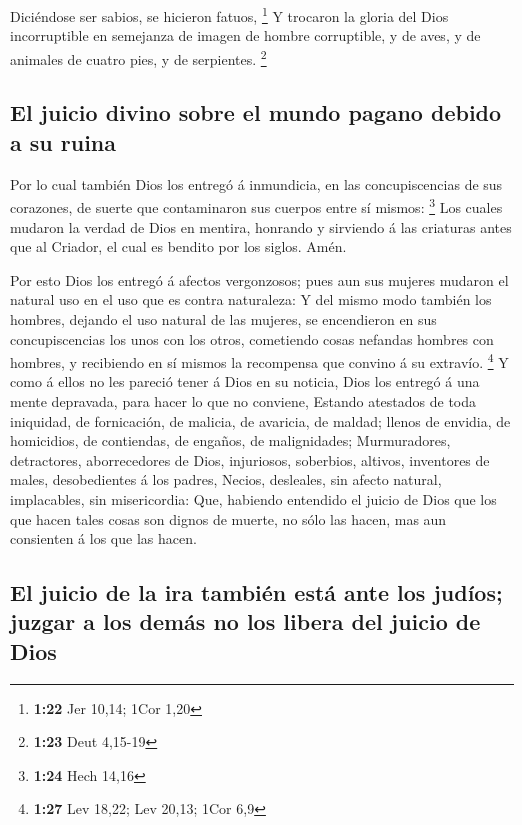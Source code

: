  Diciéndose ser sabios, se hicieron fatuos, \footnote{\textbf{1:22}
  Jer 10,14; 1Cor 1,20}  Y trocaron la gloria del Dios
incorruptible en semejanza de imagen de hombre corruptible, y de aves, y
de animales de cuatro pies, y de serpientes. \footnote{\textbf{1:23}
  Deut 4,15-19}

\hypertarget{el-juicio-divino-sobre-el-mundo-pagano-debido-a-su-ruina}{%
\subsection{El juicio divino sobre el mundo pagano debido a su
ruina}\label{el-juicio-divino-sobre-el-mundo-pagano-debido-a-su-ruina}}

 Por lo cual también Dios los entregó á inmundicia, en las
concupiscencias de sus corazones, de suerte que contaminaron sus cuerpos
entre sí mismos: \footnote{\textbf{1:24} Hech 14,16}  Los
cuales mudaron la verdad de Dios en mentira, honrando y sirviendo á las
criaturas antes que al Criador, el cual es bendito por los siglos. Amén.

 Por esto Dios los entregó á afectos vergonzosos; pues aun
sus mujeres mudaron el natural uso en el uso que es contra naturaleza:
 Y del mismo modo también los hombres, dejando el uso
natural de las mujeres, se encendieron en sus concupiscencias los unos
con los otros, cometiendo cosas nefandas hombres con hombres, y
recibiendo en sí mismos la recompensa que convino á su extravío.
\footnote{\textbf{1:27} Lev 18,22; Lev 20,13; 1Cor 6,9}  Y
como á ellos no les pareció tener á Dios en su noticia, Dios los entregó
á una mente depravada, para hacer lo que no conviene, 
Estando atestados de toda iniquidad, de fornicación, de malicia, de
avaricia, de maldad; llenos de envidia, de homicidios, de contiendas, de
engaños, de malignidades;  Murmuradores, detractores,
aborrecedores de Dios, injuriosos, soberbios, altivos, inventores de
males, desobedientes á los padres,  Necios, desleales, sin
afecto natural, implacables, sin misericordia:  Que,
habiendo entendido el juicio de Dios que los que hacen tales cosas son
dignos de muerte, no sólo las hacen, mas aun consienten á los que las
hacen.

\hypertarget{el-juicio-de-la-ira-tambiuxe9n-estuxe1-ante-los-juduxedos-juzgar-a-los-demuxe1s-no-los-libera-del-juicio-de-dios}{%
\subsection{El juicio de la ira también está ante los judíos; juzgar a
los demás no los libera del juicio de
Dios}\label{el-juicio-de-la-ira-tambiuxe9n-estuxe1-ante-los-juduxedos-juzgar-a-los-demuxe1s-no-los-libera-del-juicio-de-dios}}

